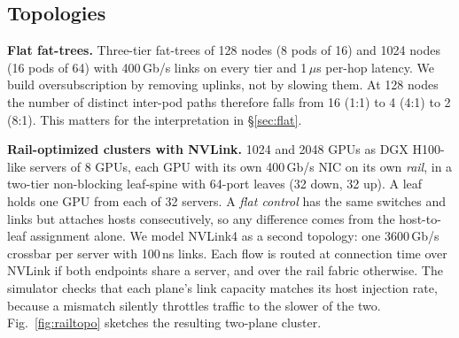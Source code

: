 \documentclass[conference]{IEEEtran}
\begin{document}
\subsection{Topologies}
\textbf{Flat fat-trees.}
Three-tier fat-trees of 128 nodes (8 pods of 16) and 1024 nodes (16 pods of
64) with 400\,Gb/s links on every tier and 1\,$\mu$s per-hop latency. We build
oversubscription by removing uplinks, not by slowing them. At 128 nodes the
number of distinct inter-pod paths therefore falls from 16 (1:1) to 4 (4:1) to 2
(8:1). This matters for the interpretation in \S\ref{sec:flat}.

\textbf{Rail-optimized clusters with NVLink.}
1024 and 2048 GPUs as DGX H100-like servers of 8 GPUs, each GPU with its own
400\,Gb/s NIC on its own \emph{rail}, in a two-tier non-blocking leaf-spine with
64-port leaves (32 down, 32 up). A leaf holds one GPU from each of 32 servers. A
\emph{flat control} has the same switches and links but attaches hosts
consecutively, so any difference comes from the host-to-leaf assignment alone. We
model NVLink4 as a second topology: one 3600\,Gb/s crossbar per server with
100\,ns links. Each flow is routed at connection time over NVLink if both
endpoints share a server, and over the rail fabric otherwise. The simulator
checks that each plane's link capacity matches its host injection rate, because
a mismatch silently throttles traffic to the slower of the two.
Fig.~\ref{fig:railtopo} sketches the resulting two-plane cluster.
\end{document}
